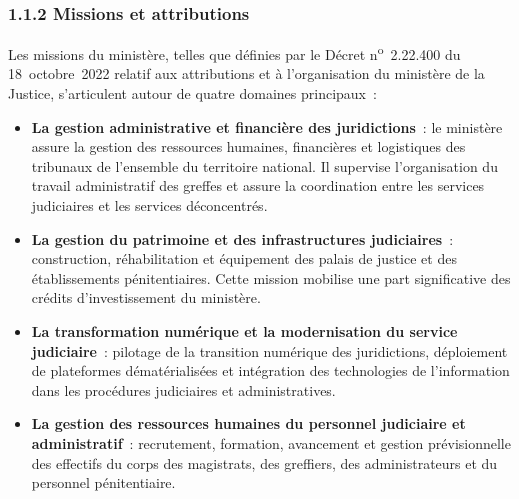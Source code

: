 \subsubsection*{1.1.2 \quad Missions et attributions}

Les missions du minist\`ere, telles que d\'efinies par le D\'ecret n\textsuperscript{o}~2.22.400 du 18~octobre~2022 relatif aux attributions et \`a l'organisation du minist\`ere de la Justice, s'articulent autour de quatre domaines principaux~:

\begin{itemize}
    \item \textbf{La gestion administrative et financi\`ere des juridictions}~: le minist\`ere assure la gestion des ressources humaines, financi\`eres et logistiques des tribunaux de l'ensemble du territoire national. Il supervise l'organisation du travail administratif des greffes et assure la coordination entre les services judiciaires et les services d\'econcentr\'es.

    \item \textbf{La gestion du patrimoine et des infrastructures judiciaires}~: construction, r\'ehabilitation et \'equipement des palais de justice et des \'etablissements p\'enitentiaires. Cette mission mobilise une part significative des cr\'edits d'investissement du minist\`ere.

\item \textbf{La transformation numérique et la modernisation du service judiciaire}~: pilotage de la transition numérique des juridictions, déploiement de plateformes dématérialisées et intégration des technologies de l’information dans les procédures judiciaires et administratives.

\item \textbf{La gestion des ressources humaines du personnel judiciaire et administratif}~: recrutement, formation, avancement et gestion pr\'evisionnelle des effectifs du corps des magistrats, des greffiers, des administrateurs et du personnel p\'enitentiaire.
\end{itemize}


